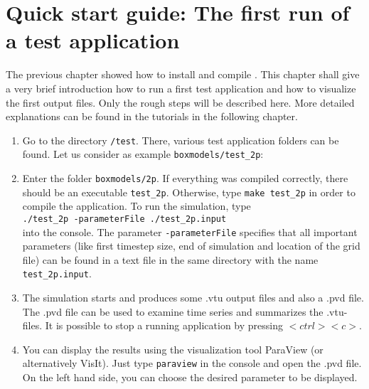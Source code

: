 \section[Quick start guide]{Quick start guide: The first run of a test application}\label{quick-start-guide}

The previous chapter showed how to install and compile \Dumux. This chapter shall give a very brief introduction how to run a first test application and how to visualize the first output files. Only the rough steps will be described here. More detailed explanations can be found in the tutorials in the following chapter.

\begin{enumerate}
 \item Go to the directory \texttt{/test}. There, various test application folders can be found. Let us consider as example \texttt{boxmodels/test{\_}2p}:
 \item Enter the folder \texttt{boxmodels/2p}. If everything was compiled correctly, there should be an executable \texttt{test{\_}2p}. Otherwise, type \texttt{make test{\_}2p} in order to compile the application. To run the simulation, type\\ 
\texttt{./test{\_}2p -parameterFile ./test\_2p.input}\\
into the console. The parameter \texttt{-parameterFile} specifies that all important parameters (like first timestep size, end of simulation and location of the grid file) can be found in a text file in the same directory  with the name \texttt{test\_2p.input}. 
 \item The simulation starts and produces some .vtu output files and also a .pvd file. The .pvd file can be used to examine time series and summarizes the .vtu-files. It is possible to stop a running application by pressing $<ctrl><c>$.
 \item You can display the results using the visualization tool ParaView (or alternatively VisIt). Just type \texttt{paraview} in the console and open the .pvd file. On the left hand side, you can choose the desired parameter to be displayed.
\end{enumerate}
% 
%
%


